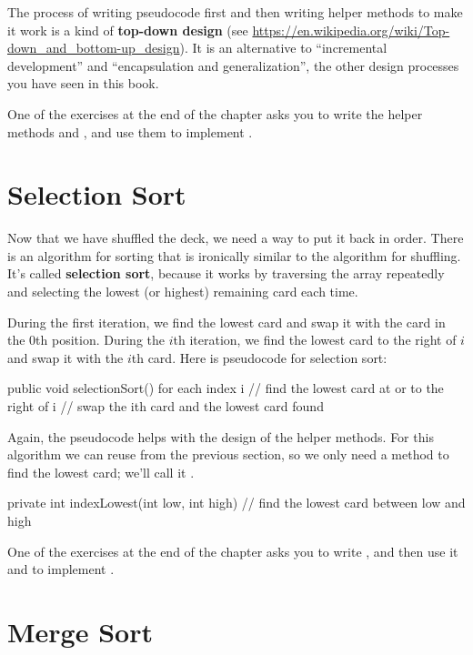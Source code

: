 The process of writing pseudocode first and then writing helper methods to make it work is a kind of {\bf top-down design} (see \url{https://en.wikipedia.org/wiki/Top-down_and_bottom-up_design}).
It is an alternative to ``incremental development'' and ``encapsulation and generalization'', the other design processes you have seen in this book.

One of the exercises at the end of the chapter asks you to write the helper methods  and , and use them to implement .


\section{Selection Sort}
\label{sorting}


Now that we have shuffled the deck, we need a way to put it back in order.
There is an algorithm for sorting that is ironically similar to the algorithm for shuffling.
It's called {\bf selection sort}, because it works by traversing the array repeatedly and selecting the lowest (or highest) remaining card each time.

During the first iteration, we find the lowest card and swap it with the card in the 0th position.
During the $i$th iteration, we find the lowest card to the right of $i$ and swap it with the $i$th card.
Here is pseudocode for selection sort:

\begin{code}
public void selectionSort() {
    for each index i {
        // find the lowest card at or to the right of i
        // swap the ith card and the lowest card found
    }
}
\end{code}

Again, the pseudocode helps with the design of the helper methods.
For this algorithm we can reuse  from the previous section, so we only need a method to find the lowest card; we'll call it .

\begin{code}
private int indexLowest(int low, int high) {
    // find the lowest card between low and high
}
\end{code}

One of the exercises at the end of the chapter asks you to write , and then use it and  to implement .


\section{Merge Sort}
\label{mergesort}

